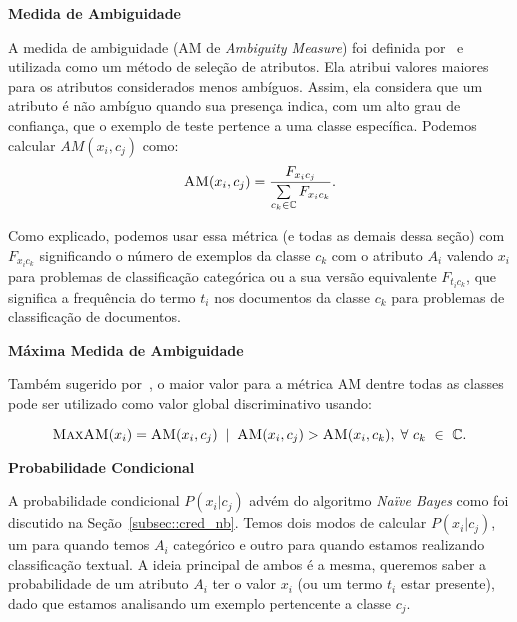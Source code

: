 \begin{description}

\item{\textbf{Medida de Ambiguidade}} %
\label{item::am}

A medida de ambiguidade (\textsc{AM} de \textit{Ambiguity Measure}) foi definida por~\cite{Mengle08} e utilizada como um método de seleção de atributos. Ela atribui valores maiores para os atributos considerados menos ambíguos. Assim, ela considera que um atributo é não ambíguo quando sua presença indica, com um alto grau de confiança, que o exemplo de teste pertence a uma classe específica. Podemos calcular $AM(x_i, c_j)$ como:
\begin{equation}\label{eqn::am}
 \textsc{AM}(x_i, c_j) = \frac{ F_{x_{i}c_{j}}}{\sum\limits_{c_k \in \mathbb{C}} F_{x_{i}c_{k}}}.
\end{equation}

Como explicado, podemos usar essa métrica (e todas as demais dessa seção) com $F_{x_{i}c_{k}}$ significando o número de exemplos da classe $c_k$ com o atributo $A_i$ valendo $x_i$ para problemas de classificação categórica ou a sua versão equivalente $F_{t_{i}c_{k}}$, que significa a frequência do termo $t_i$ nos documentos da classe $c_k$ para problemas de classificação de documentos.

\item{\textbf{Máxima Medida de Ambiguidade}}
\label{item::maxam}

Também sugerido por~\cite{Mengle08}, o maior valor para a métrica \textsc{AM} dentre todas as classes pode ser utilizado como valor global discriminativo usando:
 
 \begin{equation}\label{eqn::maxdom}
 \textsc{MaxAM}(x_i) = \textsc{AM}(x_i,c_j) \; \; | \;\; \textsc{AM}(x_i, c_j) > \textsc{AM}(x_i, c_k), \; \forall\ c_k\ \in\ \mathbb{C}.
\end{equation}


\item{\textbf{Probabilidade Condicional}} %
\label{item::pc}

A probabilidade condicional $P(x_i|c_j)$ advém do algoritmo \textit{Naïve Bayes} como foi discutido na Seção~\ref{subsec::cred_nb}.
Temos dois modos de calcular $P(x_i|c_j)$, um para quando temos $A_i$ categórico e outro para quando estamos realizando classificação textual.
A ideia principal de ambos é a mesma, queremos saber a probabilidade de um atributo $A_i$ ter o valor $x_i$ (ou um termo $t_i$ estar presente), dado que estamos analisando um exemplo pertencente a classe $c_j$.


\end{description}
